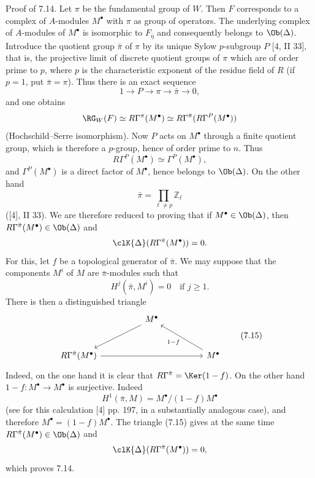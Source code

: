 Proof of 7.14. Let $\pi$ be the fundamental group of $W$. Then $F$ corresponds to a complex of $A$-modules $M^\bullet$ with $\pi$ as group of operators. The underlying complex of $A$-modules of $M^\bullet$ is isomorphic to $F_{\bar\eta}$ and consequently belongs to $\Ob(\Delta)$. Introduce the quotient group $\bar\pi$ of $\pi$ by its unique Sylow $p$-subgroup $P$ [4, II 33], that is, the projective limit of discrete quotient groups of $\pi$ which are of order prime to $p$, where $p$ is the characteristic exponent of the residue field of $R$ (if $p=1$, put $\bar\pi=\pi$). Thus there is an exact sequence
\[
1\longrightarrow P\longrightarrow \pi\longrightarrow \bar\pi\longrightarrow0,
\]
and one obtains
\[
\RG_W(F)\simeq R\Gamma^\pi(M^\bullet)
\simeq R\Gamma^{\bar\pi}(R\Gamma^P(M^\bullet))
\]
(Hochschild--Serre isomorphism). Now %
$P$ acts on $M^\bullet$ through a finite quotient group, which is therefore a $p$-group, hence of order prime to $n$. Thus
\[
R\Gamma^P(M^\bullet)\simeq \Gamma^P(M^\bullet),
\]
and $\Gamma^P(M^\bullet)$ is a direct factor of $M^\bullet$, hence belongs to $\Ob(\Delta)$. On the other hand
\[
\bar\pi=\prod_{\ell\ne p}\mathbb Z_\ell
\]
([4], II 33). We are therefore reduced to proving that if $M^\bullet\in\Ob(\Delta)$, then $R\Gamma^{\bar\pi}(M^\bullet)\in\Ob(\Delta)$ and
\[
\clK{\Delta}(R\Gamma^{\bar\pi}(M^\bullet))=0.
\]
For this, let $f$ be a topological generator of $\bar\pi$. We may suppose that the components $M^i$ of $M$ are $\bar\pi$-modules such that
\[
H^j(\bar\pi,M^i)=0\quad\text{if }j\ge1.
\]
There is then a distinguished triangle
\[
\begin{tikzcd}[column sep=huge,row sep=large]
& M^\bullet \arrow[dl] &\\
R\Gamma^{\bar\pi}(M^\bullet) \arrow[rr] && M^\bullet \arrow[ul,"1-f"]
\end{tikzcd}
\tag{7.15}
\]
Indeed, on the one hand it is clear that $R\Gamma^{\bar\pi}=\Ker(1-f)$. On the other hand $1-f:M^\bullet\to M^\bullet$ is surjective. Indeed
\[
H^1(\bar\pi,M)=M^\bullet/(1-f)M^\bullet
\]
(see for this calculation [4] pp. 197, in a substantially analogous case), and therefore $M^\bullet=(1-f)M^\bullet$. The triangle (7.15) gives at the same time $R\Gamma^{\bar\pi}(M^\bullet)\in\Ob(\Delta)$ and
\[
\clK{\Delta}(R\Gamma^{\bar\pi}(M^\bullet))=0,
\]
which proves 7.14.

